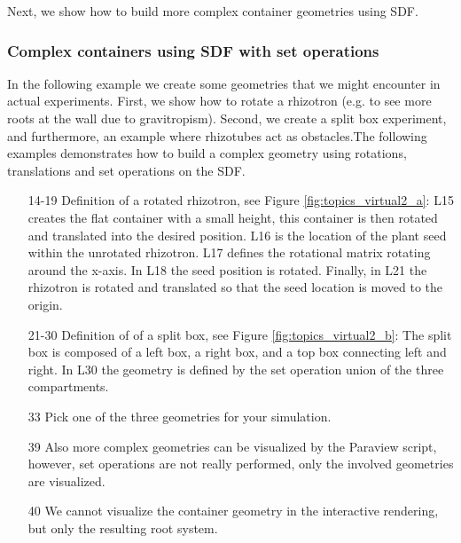 Next, we show how to build more complex container geometries using SDF. 


\subsubsection*{Complex containers using SDF with set operations}

In the following example we create some geometries that we might encounter in actual experiments. First, we show how to rotate a rhizotron (e.g. to see more roots at the wall due to gravitropism). Second, we create a split box experiment, and furthermore, an example where rhizotubes act as obstacles.The following examples demonstrates how to build a complex geometry using rotations, translations and set operations on the SDF.



\begin{itemize}
\item[14-19] Definition of a rotated rhizotron, see Figure \ref{fig:topics_virtual2_a}: 
L15 creates the flat container with a small height, this container is then rotated and translated into the desired position. L16 is the location of the plant seed within the unrotated rhizotron. L17 defines the rotational matrix rotating around the x-axis. In L18 the seed position is rotated. Finally, in L21 the rhizotron is rotated and translated so that the seed location is moved to the origin. 
\item[21-30] Definition of of a split box, see Figure \ref{fig:topics_virtual2_b}: 
The split box is composed of a left box, a right box, and a top box connecting left and right. 
In L30 the geometry is defined by the set operation union of the three compartments. 
\item[33] Pick one of the three geometries for your simulation.
\item[39] Also more complex geometries can be visualized by the Paraview script, 
however, set operations are not really performed, only the involved geometries are visualized.
\item[40] We cannot visualize the container geometry in the interactive rendering, but only the resulting root system. 
\end{itemize}

